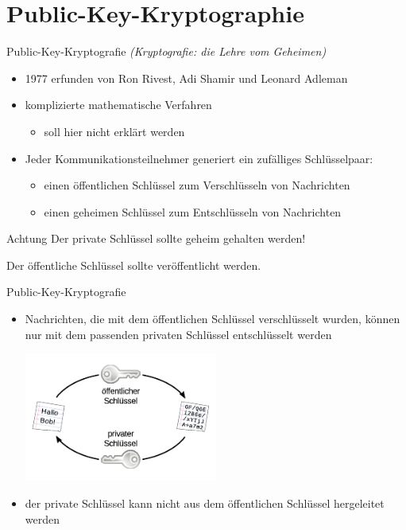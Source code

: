 \documentclass{beamer}
\begin{document}
\section{Public-Key-Kryptographie}
\begin{frame}{Public-Key-Kryptografie}
\emph{(Kryptografie: die Lehre vom Geheimen)}

\begin{itemize}
	\item 1977 erfunden von Ron Rivest, Adi Shamir und Leonard Adleman
	\item komplizierte mathematische Verfahren
	\begin{itemize}
		\item soll hier nicht erklärt werden
	\end{itemize}
	\item Jeder Kommunikationsteilnehmer generiert ein zufälliges Schlüsselpaar:
	\begin{itemize}
		\item einen öffentlichen Schlüssel zum Verschlüsseln von Nachrichten
		\item einen geheimen Schlüssel zum Entschlüsseln von Nachrichten
	\end{itemize}
\end{itemize}
\begin{alertblock}{Achtung}
	Der private Schlüssel sollte geheim gehalten werden!

	Der öffentliche Schlüssel sollte veröffentlicht werden.
\end{alertblock}
\end{frame}

\begin{frame}{Public-Key-Kryptografie}
	\begin{itemize}
		\item Nachrichten, die mit dem öffentlichen Schlüssel verschlüsselt wurden,
			können nur mit dem passenden privaten Schlüssel entschlüsselt werden
		\vfill
		\begin{center}
			\includegraphics[width=0.5\textwidth]{public-private-keys.pdf}
		\end{center}
		\vfill
		\item der private Schlüssel kann nicht aus dem öffentlichen Schlüssel
			hergeleitet werden
	\end{itemize}
\end{frame}
\end{document}
